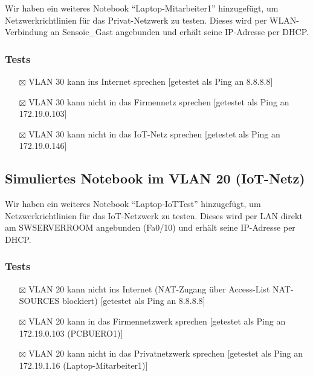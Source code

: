 \documentclass[11pt]{article}
\begin{document}
Wir haben ein weiteres Notebook ``Laptop-Mitarbeiter1'' hinzugefügt, um Netzwerkrichtlinien für das Privat-Netzwerk zu testen. Dieses wird per WLAN-Verbindung an Sensoic\_Gast angebunden und erhält seine IP-Adresse per DHCP.
\subsubsection{Tests}
\label{sec:orgd481ba7}
\begin{itemize}
\item[{$\boxtimes$}] VLAN 30 kann ins Internet sprechen [getestet als Ping an 8.8.8.8]
\item[{$\boxtimes$}] VLAN 30 kann nicht in das Firmennetz sprechen [getestet als Ping an 172.19.0.103]
\item[{$\boxtimes$}] VLAN 30 kann nicht in das IoT-Netz sprechen [getestet als Ping an 172.19.0.146]
\end{itemize}
\subsection{Simuliertes Notebook im VLAN 20 (IoT-Netz)}
\label{sec:org46c6356}

Wir haben ein weiteres Notebook ``Laptop-IoTTest'' hinzugefügt, um Netzwerkrichtlinien für das IoT-Netzwerk zu testen. Dieses wird per LAN direkt am SWSERVERROOM angebunden (Fa0/10) und erhält seine IP-Adresse per DHCP.
\subsubsection{Tests}
\label{sec:orgfd27967}

\begin{itemize}
\item[{$\boxtimes$}] VLAN 20 kann nicht ins Internet (NAT-Zugang über Access-List NAT-SOURCES blockiert) [getestet als Ping an 8.8.8.8]
\item[{$\boxtimes$}] VLAN 20 kann in das Firmennetzwerk sprechen [getestet als Ping an 172.19.0.103 (PCBUERO1)]
\item[{$\boxtimes$}] VLAN 20 kann nicht in das Privatnetzwerk sprechen [getestet als Ping an 172.19.1.16 (Laptop-Mitarbeiter1)]
\end{itemize}
\end{document}
